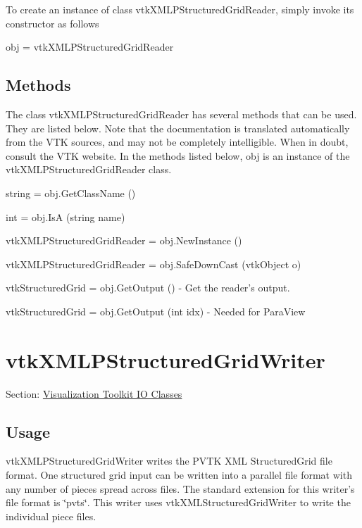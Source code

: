 To create an instance of class vtk\-X\-M\-L\-P\-Structured\-Grid\-Reader, simply invoke its constructor as follows \begin{DoxyVerb}  obj = vtkXMLPStructuredGridReader
\end{DoxyVerb}
 \hypertarget{vtkwidgets_vtkxyplotwidget_Methods}{}\subsection{Methods}\label{vtkwidgets_vtkxyplotwidget_Methods}
The class vtk\-X\-M\-L\-P\-Structured\-Grid\-Reader has several methods that can be used. They are listed below. Note that the documentation is translated automatically from the V\-T\-K sources, and may not be completely intelligible. When in doubt, consult the V\-T\-K website. In the methods listed below, {\ttfamily obj} is an instance of the vtk\-X\-M\-L\-P\-Structured\-Grid\-Reader class. 
\begin{DoxyItemize}
\item {\ttfamily string = obj.\-Get\-Class\-Name ()}  
\item {\ttfamily int = obj.\-Is\-A (string name)}  
\item {\ttfamily vtk\-X\-M\-L\-P\-Structured\-Grid\-Reader = obj.\-New\-Instance ()}  
\item {\ttfamily vtk\-X\-M\-L\-P\-Structured\-Grid\-Reader = obj.\-Safe\-Down\-Cast (vtk\-Object o)}  
\item {\ttfamily vtk\-Structured\-Grid = obj.\-Get\-Output ()} -\/ Get the reader's output.  
\item {\ttfamily vtk\-Structured\-Grid = obj.\-Get\-Output (int idx)} -\/ Needed for Para\-View  
\end{DoxyItemize}\hypertarget{vtkio_vtkxmlpstructuredgridwriter}{}\section{vtk\-X\-M\-L\-P\-Structured\-Grid\-Writer}\label{vtkio_vtkxmlpstructuredgridwriter}
Section\-: \hyperlink{sec_vtkio}{Visualization Toolkit I\-O Classes} \hypertarget{vtkwidgets_vtkxyplotwidget_Usage}{}\subsection{Usage}\label{vtkwidgets_vtkxyplotwidget_Usage}
vtk\-X\-M\-L\-P\-Structured\-Grid\-Writer writes the P\-V\-T\-K X\-M\-L Structured\-Grid file format. One structured grid input can be written into a parallel file format with any number of pieces spread across files. The standard extension for this writer's file format is \char`\"{}pvts\char`\"{}. This writer uses vtk\-X\-M\-L\-Structured\-Grid\-Writer to write the individual piece files.

